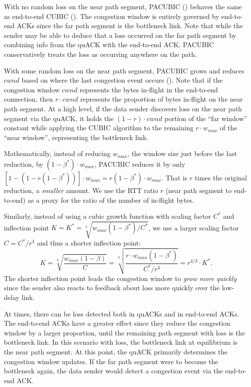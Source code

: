 With no random loss on the near path segment, PACUBIC
() behaves the same as end-to-end CUBIC
(). The congestion window is entirely governed
by end-to-end ACKs since the far path segment is the bottleneck link. Note that
while the sender may be able to deduce that a loss occurred on the far path
segment by combining info from the quACK with the end-to-end ACK, PACUBIC
conservatively treats the loss as occurring anywhere on the path.

With some random loss on the near path segment, PACUBIC grows and reduces $cwnd$
based on where the last congestion event occurs
(). Note that if the congestion window $cwnd$
represents the bytes in-flight in the end-to-end connection, then $r \cdot cwnd$
represents the proportion of bytes in-flight on the near path segment. At a
high level, if the data sender discovers loss on the near path segment via the
quACK, it holds the $(1-r)\cdot cwnd$ portion of the ``far window'' constant
while applying the CUBIC algorithm to the remaining $r \cdot w_{max}$ of the
``near window'', representing the bottleneck link.

Mathematically, instead of reducing $w_{max}$, the window size just before the
last reduction, by $(1-\beta^*) \cdot w_{max}$, PACUBIC reduces it by only
$[1 - (1-r(1-\beta^*))] \cdot w_{max} = r(1-\beta^*) \cdot w_{max}$.
That is $r$ times the original reduction, a \emph{smaller} amount.
We use the RTT ratio $r$ (near path segment to end-to-end)
as a proxy for the ratio of the number of in-flight bytes.

Similarly, instead of using a cubic growth function with scaling factor $C^*$
and inflection point $K = K^* = \sqrt[3]{w_{max}(1-\beta^*)/C^*}$,
we use a larger scaling factor $C = C^*/r^3$
and thus a shorter inflection point:
\[
K = \sqrt[3]{\frac{w_{max}(1-\beta)}{C}}
= \sqrt[3]{\frac{r\cdot w_{max}(1-\beta^*)}{C^* / r^3}}
= r^{4/3} \cdot K^*.
\]
The shorter inflection point leads the congestion window to \emph{grow more
quickly} since the sender also reacts to feedback about loss more quickly over
the low-delay link.

At times, there can be loss detected both in quACKs and in end-to-end ACKs.
The end-to-end ACKs have a greater effect since they reduce the congestion
window by a larger proportion, until the remaining path segment with loss is the
bottleneck link. In this scenario with loss, the bottleneck link at equilibrium
is the near path segment.
At this point, the quACK primarily determines the congestion window updates. If
the far path segment were to become the bottleneck again, the data sender would
detect a congestion event via the end-to-end ACK.

